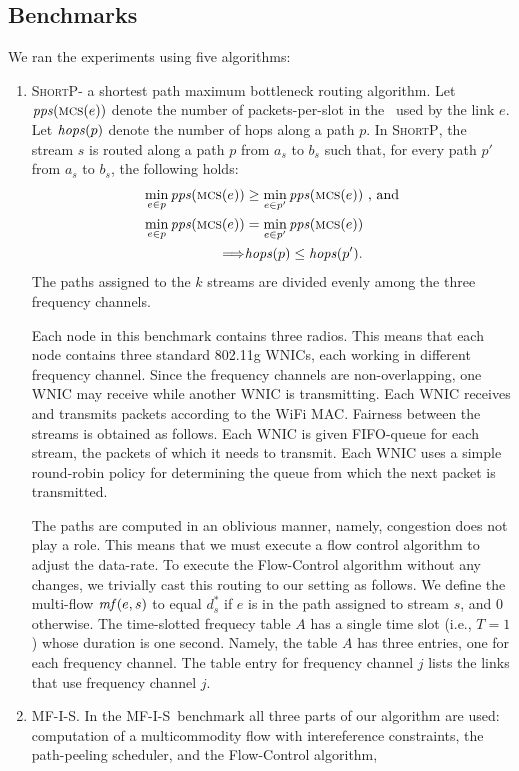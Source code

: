 \documentclass[12pt]{article}
\newenvironment{proof sketch}[1]{\noindent {\emph{Proof sketch of #1:}}}{\hfill \qed}
\newcommand{\pps}{\text{\emph{pps}}}
\newcommand{\hops}{\text{\emph{hops}}}
\newcommand{\mf}{\text{\emph{mf}}}
\newcommand{\MCS}{\text{\sc{mcs}}}
\newcommand{\algA}{\textsc{MF-I-S}}
\newcommand{\algB}{\textsc{ShortP}}
\newcommand{\algS}{\algB}
\begin{document}
\subsection{Benchmarks}
We ran the experiments using five algorithms:
\begin{enumerate}
\item \algS - a shortest path maximum bottleneck routing algorithm.
  Let $\pps(\MCS(e))$ denote the number of packets-per-slot in the
  \MCS\ used by the link $e$.  Let $\hops(p)$ denote the number of
  hops along a path $p$. In \algS, the stream $s$ is routed along a
  path $p$ from $a_s$ to $b_s$ such that, for every path $p'$ from
  $a_s$ to $b_s$, the following holds:
  \begin{align*}
    \min_{e \in p} \pps(\MCS(e)) &\geq \min_{e \in p'} \pps(\MCS(e)) \text{ , and}\\
    \min_{e \in p} \pps(\MCS(e)) &= \min_{e \in p'} \pps(\MCS(e))  \\
\Longrightarrow &\hops(p) \leq \hops(p').
  \end{align*}
  The paths assigned to the $k$ streams are divided evenly among the
  three frequency channels.

Each node in this benchmark contains three
  radios. This means that each node contains three standard 802.11g
  WNICs, each working in different frequency channel.  Since the
  frequency channels are non-overlapping, one WNIC may receive while
  another WNIC is transmitting.  Each WNIC receives and transmits
  packets according to the WiFi MAC.  Fairness between the streams is
  obtained as follows.  Each WNIC is given FIFO-queue for each stream,
  the packets of which it needs to transmit. Each WNIC uses a simple
  round-robin policy for determining the queue from which the next
  packet is transmitted.

  The paths are computed in an oblivious manner, namely, congestion
  does not play a role. This means that we must execute a flow control
  algorithm to adjust the data-rate.  To execute the Flow-Control
  algorithm without any changes, we trivially cast this routing to our
  setting as follows.  We define the multi-flow $\mf(e,s)$ to equal
  $d^*_s$ if $e$ is in the path assigned to stream $s$, and $0$
  otherwise. The time-slotted frequecy table $A$ has a single time
  slot (i.e., $T=1$) whose duration is one second. Namely, the table
  $A$ has three entries, one for each frequency channel.  The table
  entry for frequency channel $j$ lists the links that use frequency
  channel $j$.
\item \algA. In the \algA\ benchmark all three parts of our algorithm
  are used: computation of a multicommodity flow with intereference
  constraints, the path-peeling scheduler, and the Flow-Control
  algorithm,


\end{enumerate}
\end{document}
